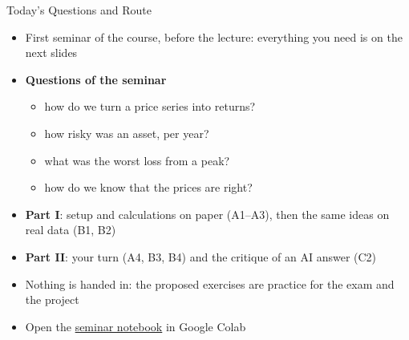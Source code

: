 \begin{frame}{Today's Questions and Route}
\itemsize{\small}
\begin{itemize}
    \item First seminar of the course, before the  lecture: everything you need is on the next slides
    \item \textbf{Questions of the seminar}
    \begin{itemize}
        \item how do we turn a price series into returns?
        \item how risky was an asset, per year?
        \item what was the worst loss from a peak?
        \item how do we know that the prices are right?
    \end{itemize}
    \item \textbf{Part I}: setup and calculations on paper (A1--A3), then the same ideas on real data (B1, B2)
    
    \item \textbf{Part II}: your turn (A4, B3, B4) and the critique of an AI answer (C2)
    
    \item Nothing is handed in: the proposed exercises are practice for the exam and the project
    \item Open the \href{\nb}{seminar notebook} in Google Colab
\end{itemize}
\end{frame}

